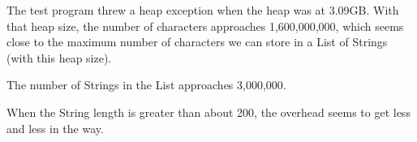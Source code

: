 The test program threw a heap exception when the heap was at 3.09GB. With that heap size, the number of characters approaches 1,600,000,000, which seems close to the maximum number of characters we can store in a List of Strings (with this heap size).

The number of Strings in the List approaches 3,000,000.

When the String length is greater than about 200, the overhead seems to get less and less in the way.